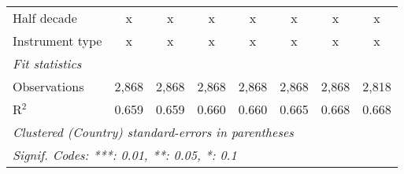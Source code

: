 \begin{tabular}{lccccccc}
   Half decade                                                                              & x            & x             & x             & x             & x            & x            & x\\  
   Instrument type                                                                          & x            & x             & x             & x             & x            & x            & x\\  
   \midrule \emph{Fit statistics}\\
   Observations                                                                             & 2,868        & 2,868         & 2,868         & 2,868         & 2,868        & 2,868        & 2,818\\  
   R$^2$                                                                                    & 0.659        & 0.659         & 0.660         & 0.660         & 0.665        & 0.668        & 0.668\\  
   \midrule
   \multicolumn{8}{l}{\emph{Clustered (Country) standard-errors in parentheses}}\\
   \multicolumn{8}{l}{\emph{Signif. Codes: ***: 0.01, **: 0.05, *: 0.1}}\\
\end{tabular}
\par\endgroup


